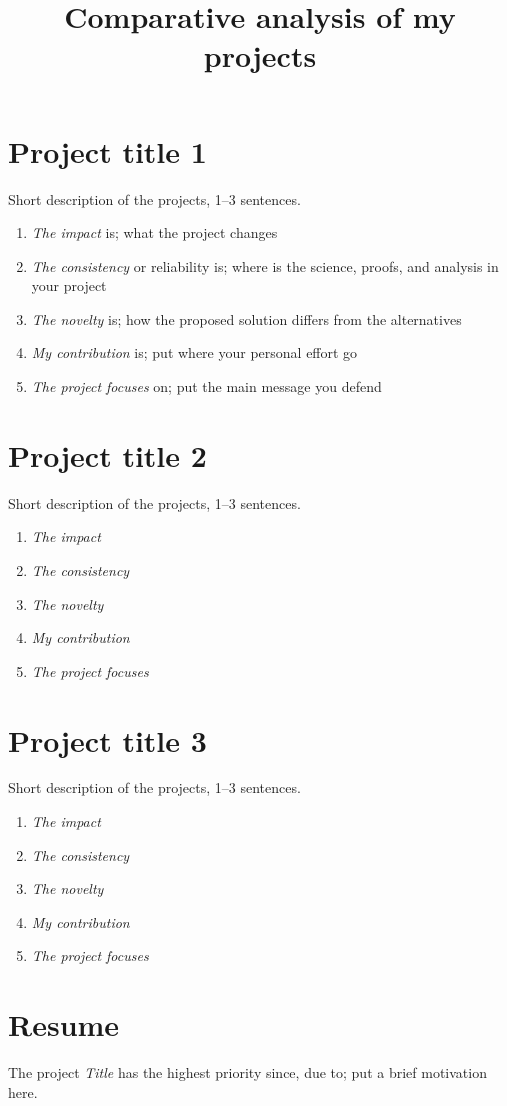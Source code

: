 \documentclass[12pt]{article}
\title{Comparative analysis of my projects}
\date{}
\begin{document}
\maketitle

\section{Project title 1}
Short description of the projects, 1--3 sentences. 
\begin{enumerate}
\item \emph{The impact} is; what the project changes 
\item \emph{The consistency} or reliability is; where is the science, proofs, and analysis in your project
\item \emph{The novelty} is; how the proposed solution differs from the alternatives
\item \emph{My contribution} is; put where your personal effort go
\item \emph{The project focuses} on; put the main message you defend
\end{enumerate}

\section{Project title 2}
Short description of the projects, 1--3 sentences. 
\begin{enumerate}
\item \emph{The impact} 
\item \emph{The consistency} 
\item \emph{The novelty} 
\item \emph{My contribution} 
\item \emph{The project focuses} 
\end{enumerate}

\section{Project title 3}
Short description of the projects, 1--3 sentences. 
\begin{enumerate}
\item \emph{The impact} 
\item \emph{The consistency} 
\item \emph{The novelty} 
\item \emph{My contribution}  
\item \emph{The project focuses}  
\end{enumerate}

\section{Resume}
The project \emph{Title} has the highest priority since, due to; put a brief motivation here. 
\end{document}
